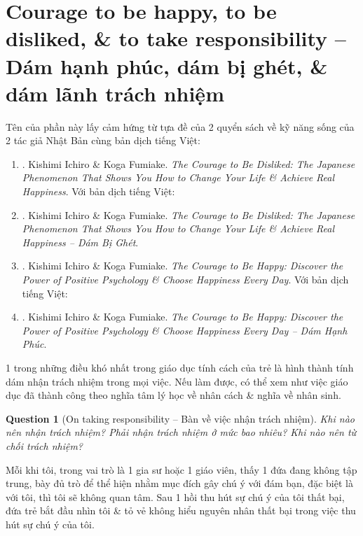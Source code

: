 \documentclass[12pt,oneside]{book}
\newtheorem{question}{Question}
\begin{document}
\section{Courage to be happy, to be disliked, \& to take responsibility -- Dám hạnh phúc, dám bị ghét, \& dám lãnh trách nhiệm}
Tên của phần này lấy cảm hứng từ tựa đề của 2 quyển sách về kỹ năng sống của 2 tác giả Nhật Bản cùng bản dịch tiếng Việt:
\begin{enumerate}
	\item \cite{Ichiro_Fumitake_disliked}. {\sc Kishimi Ichiro \& Koga Fumiake}. {\it The Courage to Be Disliked: The Japanese Phenomenon That Shows You How to Change Your Life \& Achieve Real Happiness}. Với bản dịch tiếng Việt:
	\item \cite{Ichiro_Fumitake_disliked_VN}. {\sc Kishimi Ichiro \& Koga Fumiake}. {\it The Courage to Be Disliked: The Japanese Phenomenon That Shows You How to Change Your Life \& Achieve Real Happiness -- Dám Bị Ghét}.
	\item \cite{Ichiro_Fumitake_happy}. {\sc Kishimi Ichiro \& Koga Fumiake}. {\it The Courage to Be Happy: Discover the Power of Positive Psychology \& Choose Happiness Every Day}. Với bản dịch tiếng Việt:
	\item \cite{Ichiro_Fumitake_happy_VN}. {\sc Kishimi Ichiro \& Koga Fumiake}. {\it The Courage to Be Happy: Discover the Power of Positive Psychology \& Choose Happiness Every Day -- Dám Hạnh Phúc}.
\end{enumerate}
1 trong những điều khó nhất trong giáo dục tính cách của trẻ là hình thành tính dám nhận trách nhiệm trong mọi việc. Nếu làm được, có thể xem như việc giáo dục đã thành công theo nghĩa tâm lý học về nhân cách \& nghĩa về nhân sinh.

\begin{question}[On taking responsibility -- Bàn về việc nhận trách nhiệm]
	Khi nào nên nhận trách nhiệm? Phải nhận trách nhiệm ở mức bao nhiêu? Khi nào nên từ chối trách nhiệm?
\end{question}
Mỗi khi tôi, trong vai trò là 1 gia sư hoặc 1 giáo viên, thấy 1 đứa đang không tập trung, bày đủ trò để thể hiện nhằm mục đích gây chú ý với đám bạn, đặc biệt là với tôi, thì tôi sẽ không quan tâm. Sau 1 hồi thu hút sự chú ý của tôi thất bại, đứa trẻ bắt đầu nhìn tôi \& tỏ vẻ không hiểu nguyên nhân thất bại trong việc thu hút sự chú ý của tôi.
\end{document}
